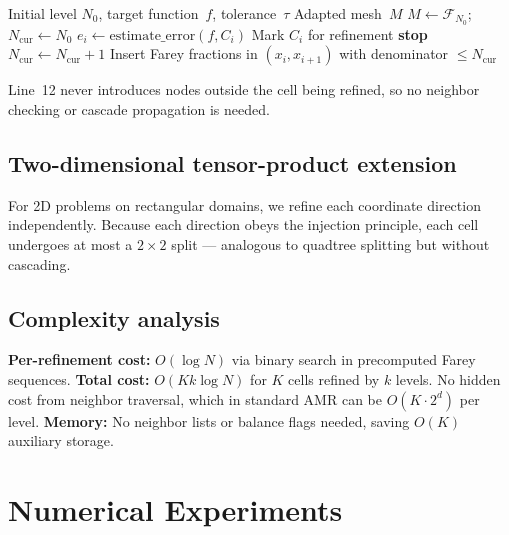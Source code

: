 \documentclass[11pt]{article}
\theoremstyle{definition}
\newcommand{\F}{\mathcal{F}}
\begin{document}
\begin{algorithm}[ht]
\caption{Farey AMR (1D)}
\label{alg:farey1d}
\begin{algorithmic}[1]
\REQUIRE Initial level $N_0$, target function~$f$, tolerance~$\tau$
\ENSURE Adapted mesh~$M$
\STATE $M \gets \F_{N_0}$; $N_{\mathrm{cur}} \gets N_0$
\REPEAT
    \STATE $e_i \gets \text{estimate\_error}(f, C_i)$
     \STATE Mark $C_i$ for refinement \ENDIF
  \ENDFOR
   \STATE \textbf{stop} \ENDIF
  \STATE $N_{\mathrm{cur}} \gets N_{\mathrm{cur}} + 1$
    \STATE Insert Farey fractions in $(x_i, x_{i+1})$ with
      denominator $\le N_{\mathrm{cur}}$
  \ENDFOR
{}
\end{algorithmic}
\end{algorithm}

Line~12 never introduces nodes outside the cell being refined, so
no neighbor checking or cascade propagation is needed.

\subsection{Two-dimensional tensor-product extension}

For 2D problems on rectangular domains, we refine each coordinate
direction independently. Because each direction obeys the injection
principle, each cell undergoes at most a $2 \times 2$ split ---
analogous to quadtree splitting but without cascading.

\subsection{Complexity analysis}

\textbf{Per-refinement cost:} $O(\log N)$ via binary search in
precomputed Farey sequences. \textbf{Total cost:} $O(Kk \log N)$
for $K$ cells refined by $k$ levels. No hidden cost from neighbor
traversal, which in standard AMR can be $O(K \cdot 2^d)$ per level.
\textbf{Memory:} No neighbor lists or balance flags needed, saving
$O(K)$ auxiliary storage.


\section{Numerical Experiments}\label{sec:experiments}
\end{document}
